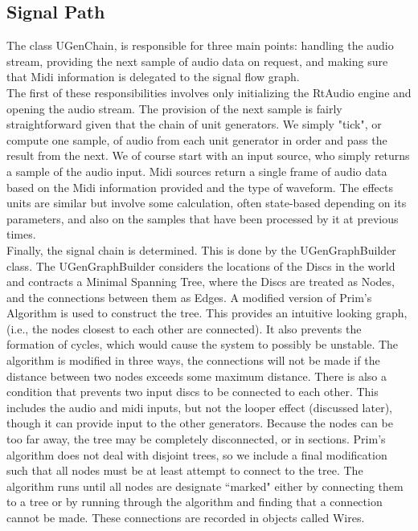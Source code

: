 \documentclass[pdftext,twoside,10pt]{article}
\begin{document}
\subsection{Signal Path}
The class UGenChain, is responsible for three main points: handling the audio stream, providing the next sample of audio data on request, and making sure that Midi information is delegated to the signal flow graph.\\
The first of these responsibilities involves only initializing the RtAudio engine and opening the audio stream. The provision of the next sample is fairly straightforward given that the chain of unit generators. We simply "tick", or compute one sample, of audio from each unit generator in order and pass the result from the next. We of course start with an input source, who simply returns a sample of the audio input. Midi sources return a single frame of audio data based on the Midi information provided and the type of waveform. The effects units are similar but involve some calculation, often state-based depending on its parameters, and also on the samples that have been processed by it at previous times.\\

Finally, the signal chain is determined. This is done by the UGenGraphBuilder class. The UGenGraphBuilder considers the locations of the Discs in the world and contracts a Minimal Spanning Tree, where the Discs are treated as Nodes, and the connections between them as Edges. A modified version of Prim's Algorithm is used to construct the tree. This provides an intuitive looking graph, (i.e., the nodes closest to each other are connected). It also prevents the formation of cycles, which would cause the system to possibly be unstable. The algorithm is modified in three ways, the connections will not be made if the distance between two nodes exceeds some maximum distance. There is also a condition that prevents two input discs to be connected to each other. This includes the audio and midi inputs, but not the looper effect (discussed later), though it can provide input to the other generators. Because the nodes can be too far away, the tree may be completely disconnected, or in sections. Prim's algorithm does not deal with disjoint trees, so we include a final modification such that all nodes must be at least attempt to connect to the tree. The algorithm runs until all nodes are designate ``marked" either by connecting them to a tree or by running through the algorithm and finding that a connection cannot be made. These connections are recorded in objects called Wires.\\
\end{document}
